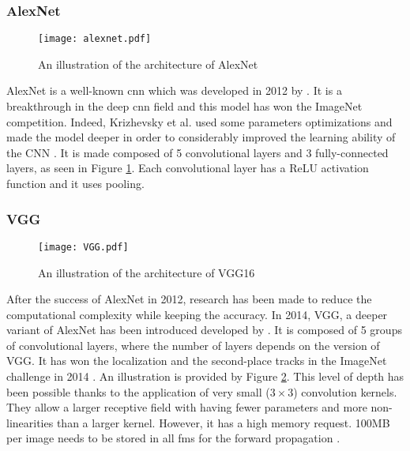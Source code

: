 \subsubsection{AlexNet}
%
\begin{figure}
    \centering
    \texttt{[image: alexnet.pdf]}
    \caption{An illustration of the architecture of AlexNet \cite{krizhevsky_imagenet_2012}}
    \label{fig:alexnet}
\end{figure}
%
AlexNet is a well-known \acrshort{cnn} which was developed in 2012 by \textcite{krizhevsky_imagenet_2012}. It is a breakthrough in the deep \acrshort{cnn} field and this model has won the ImageNet competition. Indeed, Krizhevsky et al. used some parameters optimizations and made the model deeper in order to considerably improved the learning ability of the CNN \cite{khan_survey_2020}. It is made composed of 5 convolutional layers and 3 fully-connected layers, as seen in Figure \ref{fig:alexnet}. Each convolutional layer has a ReLU activation function and it uses pooling.
\subsubsection{VGG}
%
\begin{figure}
    \centering
    \texttt{[image: VGG.pdf]}
    \caption{An illustration of the architecture of VGG16 \cite{simonyan_very_2015}}
    \label{fig:vgg}
\end{figure}
%
After the success of AlexNet in 2012, research has been made to reduce the computational complexity while keeping the accuracy. In 2014, VGG, a deeper variant of AlexNet has been introduced developed by \textcite{simonyan_very_2015}. It is composed of 5 groups of convolutional layers, where the number of layers depends on the version of VGG. It has won the localization and the second-place tracks in the ImageNet challenge in 2014 \cite{simonyan_very_2015}. An illustration is provided by Figure \ref{fig:vgg}. This level of depth has been possible thanks to the application of very small ($3 \times 3$) convolution kernels. They allow a larger receptive field with having fewer parameters and more non-linearities than a larger kernel. However, it has a high memory request. 100MB per image needs to be stored in all \acrshort{fm}s for the forward propagation \cite{matteucci_artificial_2019}.

